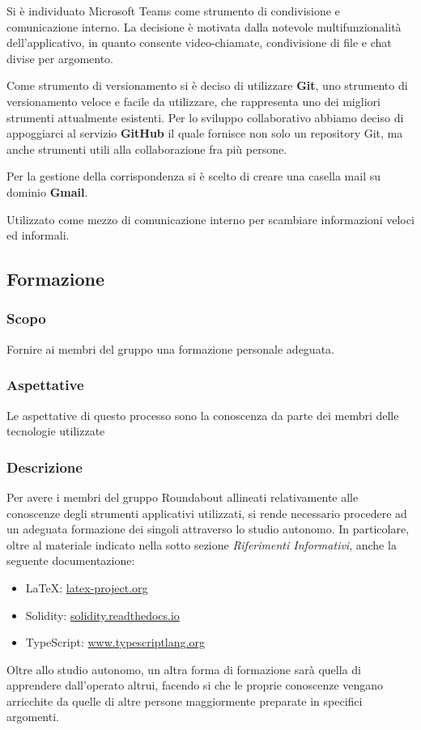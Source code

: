 				Si è individuato Microsoft Teams come strumento di condivisione e comunicazione interno. La decisione è motivata dalla notevole multifunzionalità dell'applicativo, in quanto consente video-chiamate, condivisione di file e chat divise per argomento.
				
				Come strumento di versionamento si è deciso di utilizzare \textbf{Git}, uno strumento di versionamento veloce e facile da utilizzare, che rappresenta uno dei migliori strumenti attualmente esistenti. Per lo sviluppo collaborativo abbiamo deciso di appoggiarci al servizio \textbf{GitHub} il quale fornisce non solo un repository Git, ma anche strumenti utili alla collaborazione fra più persone.
			
				Per la gestione della corrispondenza si è scelto di creare una casella mail su dominio \textbf{Gmail}.
				
				Utilizzato come mezzo di comunicazione interno per scambiare informazioni veloci ed informali.
				

	\subsection{Formazione}
	
		\subsubsection{Scopo}
		Fornire ai membri del gruppo una formazione personale adeguata.
		
		\subsubsection{Aspettative}
		Le aspettative di questo processo sono la conoscenza da parte dei membri delle tecnologie utilizzate
		
		\subsubsection{Descrizione}		
		Per avere i membri del gruppo Roundabout allineati relativamente alle conoscenze degli strumenti applicativi utilizzati, si rende necessario procedere ad un adeguata formazione dei singoli attraverso lo studio autonomo. In particolare, oltre al materiale indicato nella sotto sezione \textit{Riferimenti Informativi}, anche la seguente documentazione:
		\begin{itemize}
			\item \LaTeX{}: \href{latex-project.org}{latex-project.org}
			\item Solidity: \href{solidity.readthedocs.io}{solidity.readthedocs.io}
			\item TypeScript: \href{www.typescriptlang.org}{www.typescriptlang.org}
		\end{itemize}
		Oltre allo studio autonomo, un altra forma di formazione sarà quella di apprendere dall'operato altrui, facendo si che le proprie conoscenze vengano arricchite da quelle di altre persone maggiormente preparate in specifici argomenti.
